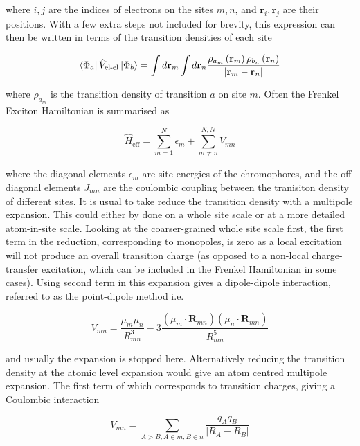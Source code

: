 where $i,j$ are the indices of electrons on the sites $m,n$, and $\mathbf{r}_i, 
\mathbf{r}_j$ are their positions. With a few extra steps not included for brevity,
this expression can then be written in terms of the transition densities of each 
site\cite{Scholes2003}

\begin{equation}
\bra{\Phi_a} \hat{V}_{\text{el-el}}\ket{\Phi_b} = \int d\mathbf{r}_{m} \int d\mathbf{r}_{n} \frac{\rho_{a_m}\left(\mathbf{r}_{m}\right)\rho_{b_n}\left(\mathbf{r}_{n}\right)}{\left|\mathbf{r}_{m} - \mathbf{r}_{n}\right|}
\end{equation}

where $\rho_{a_m}$ is the transition density of transition $a$ on site $m$. Often
the Frenkel Exciton Hamiltonian is summarised as

\begin{equation}
\hat{H}_{\text{eff}} = \sum^N_{m=1} \epsilon_m + \sum^{N,N}_{m \neq n} V_{mn}
\end{equation}

where the diagonal elements $\epsilon_m$ are site energies of the chromophores, 
and the off-diagonal elements $J_{mn}$ are the coulombic coupling between the tranisiton
density of different sites. It is usual to take reduce the transition density with
a multipole expansion\cite{Steinmann2015}. This could either by done on a whole site
scale or at a more detailed atom-in-site scale. Looking at the coarser-grained whole
site scale first, the first term in the reduction, corresponding to monopoles, is
zero as a local excitation will not produce an overall transition charge (as opposed 
to a non-local charge-transfer excitation, which can be included in the Frenkel 
Hamiltonian in some cases\cite{Li2017}). Using second term in this expansion gives
a dipole-dipole interaction, referred to as the point-dipole method
i.e.

\begin{equation}
    V_{mn} = \frac{\mu_m \mu_n}{R_{mn}^3} - 3 \frac{\left(\mu_m \cdot \mathbf{R}_{mn}\right) \left( \mu_n \cdot \mathbf{R}_{mn} \right)}{R_{mn}^5}
\end{equation}

and usually the expansion is stopped here. Alternatively reducing the transition 
density at the atomic level expansion would give an atom centred multipole expansion.
The first term of which corresponds to transition charges, giving a Coulombic interaction

\begin{equation}
    V_{mn} = \sum_{A>B,A \in m, B \in n}\frac{q_A q_B}{\left\lvert R_A - R_B \right\rvert}
\end{equation}

